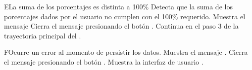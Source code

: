 
\begin{UCtrayectoriaA}{E}{La suma de los porcentajes es distinta a 100\%}
    \UCpaso Detecta que la suma de los porcentajes dados por el usuario no cumplen con el 100\% requerido.
    \UCpaso Muestra el mensaje 
    \UCpaso[\UCactor] Cierra el mensaje presionando el botón .
    \UCpaso Continua en el paso 3 de la trayectoria principal del .
\end{UCtrayectoriaA}


\begin{UCtrayectoriaA}{F}{Ocurre un error al momento de persistir los datos.}
	\UCpaso Muestra el mensaje .
	\UCpaso[\UCactor] Cierra el mensaje presionando el botón .
	\UCpaso Muestra la interfaz de usuario .
\end{UCtrayectoriaA}